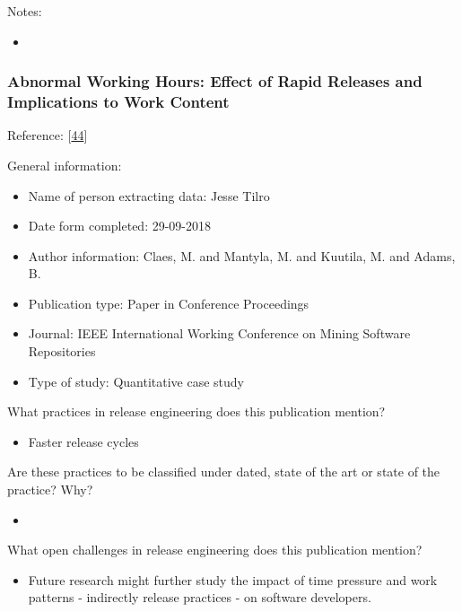 \documentclass[]{book}
\providecommand{\tightlist}{%
  \setlength{\itemsep}{0pt}\setlength{\parskip}{0pt}}
\begin{document}
Notes:

\begin{itemize}
\item
\end{itemize}

\subsubsection{Abnormal Working Hours: Effect of Rapid Releases and
Implications to Work
Content}\label{abnormal-working-hours-effect-of-rapid-releases-and-implications-to-work-content}

Reference: {[}\protect\hyperlink{ref-claes2017a}{44}{]}

General information:

\begin{itemize}
\tightlist
\item
  Name of person extracting data: Jesse Tilro
\item
  Date form completed: 29-09-2018
\item
  Author information: Claes, M. and Mantyla, M. and Kuutila, M. and
  Adams, B.
\item
  Publication type: Paper in Conference Proceedings
\item
  Journal: IEEE International Working Conference on Mining Software
  Repositories
\item
  Type of study: Quantitative case study
\end{itemize}

What practices in release engineering does this publication mention?

\begin{itemize}
\tightlist
\item
  Faster release cycles
\end{itemize}

Are these practices to be classified under dated, state of the art or
state of the practice? Why?

\begin{itemize}
\item
\end{itemize}

What open challenges in release engineering does this publication
mention?

\begin{itemize}
\tightlist
\item
  Future research might further study the impact of time pressure and
  work patterns - indirectly release practices - on software developers.
\end{itemize}
\end{document}
